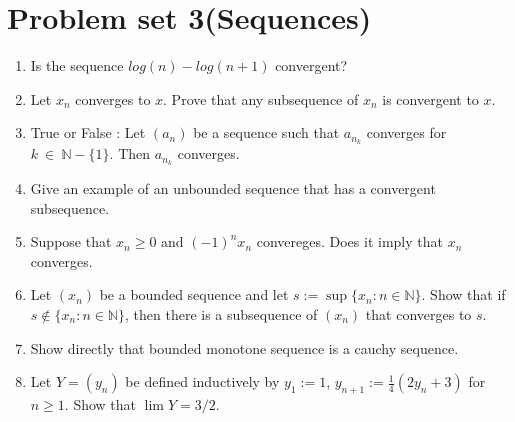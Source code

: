 \documentclass[12pt]{article}
\begin{document}
\newpage

\section{Problem set 3(Sequences)}
    \begin{enumerate}
        \item Is the sequence $ log (n) - log(n+1) $ convergent?
        \item Let $x_n $ converges to $x$. Prove that any subsequence of $x_n $ is convergent to $x$.
        \item True or False :
        Let $(a_n)$ be a sequence such that $a_{n_k}$ converges for $k~\in~ \mathbb N - \{1\}$. Then $a_{n_k}$ converges. 
        \item Give an example of an unbounded sequence that has a convergent subsequence.
        \item Suppose that $x_n\geq0$ and $(-1)^nx_n$ convereges. Does it imply that $x_n$ converges.
        \item Let $(x_n)$ be a bounded sequence and let $s := \sup\{x_n : n \in \mathbb{N}\}$. Show that if $s \notin \{x_n : n \in \mathbb{N}\}$, then there is a subsequence of $(x_n)$ that converges to $s$.
        \item Show directly that bounded monotone sequence is a cauchy sequence.
        \item Let $Y = (y_n)$ be defined inductively by $y_1 := 1$, $y_{n+1} := \frac{1}{4}(2y_n+3)$ for $n \ge 1$. Show that $\lim Y = 3/2$.
    \end{enumerate}
\end{document}
